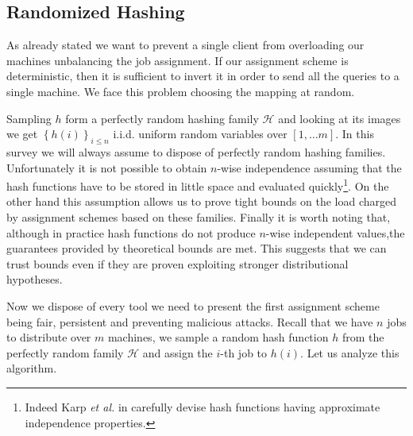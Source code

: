 \subsection{Randomized Hashing}
As already stated we want to prevent a single client from overloading
our machines unbalancing the job assignment. If our assignment scheme is
deterministic, then it is sufficient to invert it in order to send all the
queries to a single machine. We face this problem choosing the mapping
at random.

\begin{definition}{\textbf{(Perfectly Random Hashing)}
    Let $\left(\mathcal{H}, \pr \right)$ be a probability space where
    $\mathcal{H} \subset \left\{h \, | \, h : [1, \dots n]
      \rightarrow [1, \dots m]\right\} $ are hash functions.
    We define it a perfectly random hashing family if
    \begin{equation*}
      \pr\left(h(a) = \alpha_a \, \left| \, \bigwedge_{b \neq a}h(b) = \alpha_b
      \right\right) = \frac{1}{m} 
  \end{equation*}
  for each choice of $a$ and $\{\alpha_j\}_{j\leq n}$.
\end{definition}
Sampling $h$ form a perfectly random hashing family $\mathcal{H}$ and looking
at its images we get $\left\{h(i)\right\}_{i\leq n}$ i.i.d. uniform
random variables over $[1, \dots m]$.
In this survey we will always assume to dispose of perfectly random
hashing families. Unfortunately it is not possible to obtain $n$-wise
independence assuming that the hash functions have to be stored in
little space and evaluated quickly\footnote{Indeed Karp {\em et al.} in
\cite{Karp} carefully devise hash functions having approximate independence
properties.}. On the other hand this assumption allows us to prove tight
bounds on the load charged by assignment schemes based on these families.
Finally it is worth noting that, although in practice hash functions do not
produce $n$-wise independent values,the guarantees provided by theoretical
bounds are met. This suggests that we can trust bounds even if they are
proven exploiting stronger distributional hypotheses.

Now we dispose of every tool we need to present the first assignment scheme
being fair, persistent and preventing malicious attacks.
Recall that we have $n$ jobs to distribute over $m$ machines, we sample a
random hash function $h$ from the perfectly random family $\mathcal{H}$ and
assign the $i$-th job to $h(i)$. Let us analyze this algorithm.

